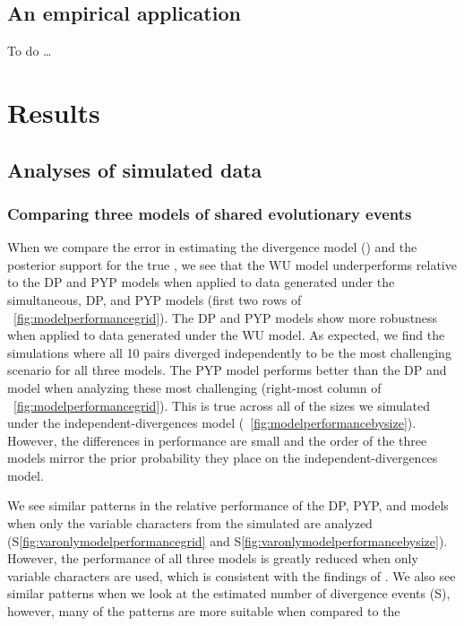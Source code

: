 \documentclass[letterpaper,12pt]{article}
\begin{document}
\subsection{An empirical application}

To do \ldots

\section{Results}

\subsection{Analyses of simulated data}

\subsubsection{Comparing three models of shared evolutionary events}

When we compare the error in estimating the divergence model (\etimesets) and
the posterior support for the true \etimesets, we see that the WU model
underperforms relative to the DP and PYP models when applied to data generated
under the simultaneous, DP, and PYP models
(first two rows of \fig~\ref{fig:modelperformancegrid}).
The DP and PYP models show more robustness when applied to
data generated under the WU model.
As expected, we find the simulations where all 10 pairs diverged independently
to be the most challenging scenario for all three models.
The PYP model performs better than the DP and \wunif model
when analyzing these most challenging \datasets
(right-most column of \fig~\ref{fig:modelperformancegrid}).
This is true across all of the \dataset sizes we simulated
under the independent-divergences model
(\fig~\ref{fig:modelperformancebysize}).
However, the differences in performance are small and the order of the three
models mirror the prior probability they place on the independent-divergences
model.

We see similar patterns in the relative performance of the DP, PYP, and
\wunif models when only the variable characters from the simulated
\datasets are analyzed
(\figs S\ref{fig:varonlymodelperformancegrid}
and S\ref{fig:varonlymodelperformancebysize}).
However, the performance of all three models is greatly reduced when
only variable characters are used,
which is consistent with the findings of
\citet{Oaks2018ecoevolity,Oaks2018paic,Oaks2019codemog}.
We also see similar patterns when we look at the estimated
number of divergence events
(\figs S), however, many of the patterns are more
suitable when compared to the 
\end{document}
